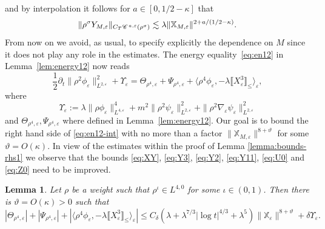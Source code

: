 \documentclass[a4paper,11pt]{article}
\newtheorem{lemma}[theorem]{Lemma}
\numberwithin{equation}{section}
\begin{document}
and by interpolation it follows for $a \in [0, 1 / 2 - \kappa]$ that
\begin{equation}
  \| \rho^{\sigma} Y_{M, \varepsilon} \|_{C_T \mathscr{C} \hspace{.1em}^{a,
  \varepsilon} (\rho^{\sigma})} \lesssim \lambda \| \mathbb{X}_{M,
  \varepsilon} \|^{2 + a / (1 / 2 - \kappa)} . \label{eq:interp-Y}
\end{equation}
From now on we avoid, as usual, to specify explicitly the dependence on $M$
since it does not play any role in the estimates. The energy
equality~{\eqref{eq:en12}} in Lemma~\ref{lem:energy12} now reads
\begin{equation}
  \frac{1}{2} \partial_t \| \rho^2 \phi_{\varepsilon} \|_{L^{2,
  \varepsilon}}^2 + \Upsilon_{\varepsilon} = \Theta_{\rho^4, \varepsilon} +
  \Psi_{\rho^4, \varepsilon} + \langle \rho^4 \phi_{\varepsilon}, - \lambda
  \llbracket X_{\varepsilon}^3 \rrbracket_{\leqslant} \rangle_{\varepsilon},
  \label{eq:en12-int}
\end{equation}
where
\[
\Upsilon_{\varepsilon}:=\lambda\|\rho\phi_{\varepsilon}\|_{L^{4,\varepsilon}}^{4}+m^{2}\|\rho^{2}\psi_{\varepsilon}\|_{L^{2,\varepsilon}}^{2}+\|\rho^{2}\nabla_{\varepsilon}\psi_{\varepsilon}\|_{L^{2,\varepsilon}}^{2}
\]
and $\Theta_{\rho^4, \varepsilon}, \Psi_{\rho^4, \varepsilon}$ where defined in Lemma~\ref{lem:energy12}.
Our goal is to bound the right hand side of \eqref{eq:en12-int}
with no more than a factor $\| \mathbb{X}_{M, \varepsilon} \|^{8 + \vartheta}$
for some $\vartheta = O (\kappa)$. In view of the estimates within the proof of Lemma \ref{lemma:bounds-rhs1} we
observe that the bounds {\eqref{eq:XY}}, {\eqref{eq:Y3}}, {\eqref{eq:Y2}},
{\eqref{eq:Y11}}, {\eqref{eq:U0}} and {\eqref{eq:Z0}} need to be improved.

\begin{lemma}
  \label{lemma:bounds-rhs1-int}Let $\rho$ be a weight such that $\rho^{\iota}
  \in L^{4, 0}$ for some $\iota \in (0, 1)$. Then there is $\vartheta = O
  (\kappa)>0$ such that
  \[ | \Theta_{\rho^4, \varepsilon} | + | \Psi_{\rho^4, \varepsilon} |+|\langle \rho^4 \phi_{\varepsilon}, - \lambda
\llbracket X_{\varepsilon}^3 \rrbracket_{\leqslant} \rangle_{\varepsilon}|
     \leqslant C_{\delta}  (\lambda + \lambda^{7 / 3} | \log t|^{4 / 3} +
     \lambda^5) \| \mathbb{X}_{\varepsilon} \|^{8 + \vartheta} + \delta
     \Upsilon_{\varepsilon} . \]
\end{lemma}
\end{document}
